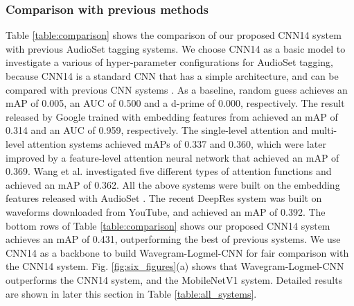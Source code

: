 \documentclass[journal]{IEEEtran}
\begin{document}
\subsubsection{Comparison with previous methods}
Table \ref{table:comparison} shows the comparison of our proposed CNN14 system with previous AudioSet tagging systems. We choose CNN14 as a basic model to investigate a various of hyper-parameter configurations for AudioSet tagging, because CNN14 is a standard CNN that has a simple architecture, and can be compared with previous CNN systems \cite{choi2016automatic}\cite{kong2019cross}. As a baseline, random guess achieves an mAP of 0.005, an AUC of 0.500 and a d-prime of 0.000, respectively. The result released by Google \cite{gemmeke2017audio} trained with embedding features from \cite{hershey2017cnn} achieved an mAP of 0.314 and an AUC of 0.959, respectively. The single-level attention and multi-level attention systems \cite{kong2018audio, yu2018multi} achieved mAPs of 0.337 and 0.360, which were later improved by a feature-level attention neural network that achieved an mAP of 0.369. Wang et al. \cite{wang2019comparison} investigated five different types of attention functions and achieved an mAP of 0.362. All the above systems were built on the embedding features released with AudioSet \cite{gemmeke2017audio}. The recent DeepRes system \cite{ford2019deep} was built on waveforms downloaded from YouTube, and achieved an mAP of 0.392. The bottom rows of Table \ref{table:comparison} shows our proposed CNN14 system achieves an mAP of 0.431, outperforming the best of previous systems. We use CNN14 as a backbone to build Wavegram-Logmel-CNN for fair comparison with the CNN14 system. Fig. \ref{fig:six_figures}(a) shows that Wavegram-Logmel-CNN outperforms the CNN14 system, and the MobileNetV1 system. Detailed results are shown in later this section in Table \ref{table:all_systems}.
\end{document}

